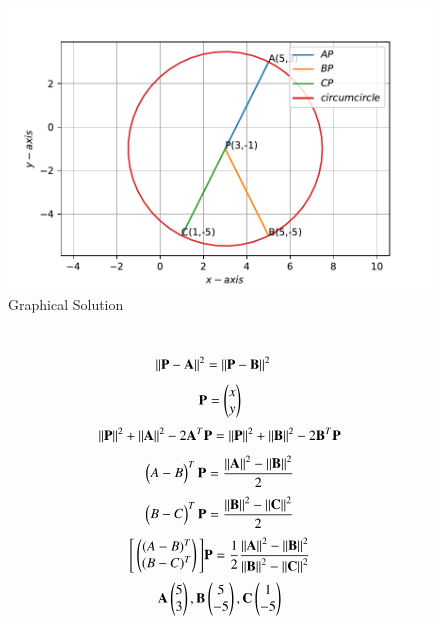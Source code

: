 \documentclass[journal,12pt,twocolumn]{IEEEtran}
\begin{document}
\begin{figure}
    \centering
    \includegraphics[width=\columnwidth]{equidistant point circumcircle.pdf}
    \caption{Graphical Solution}
    \label{fig:my_label}
\end{figure}\\
\begin{align}
    \norm{\Vec{P}-\vec{A}}^2 &= \norm{\vec{P}-\vec{B}}^2
\end{align}
\begin{align}
        \Vec{P}=\myvec{x\\y}
    \end{align}
\begin{align}
    \left\lVert\mathbf{P}\right\rVert^2 + \left\lVert\mathbf{A}\right\rVert^2 -2\mathbf{A}^T\mathbf{P} = \left\lVert\mathbf{P}\right\rVert^2 + \left\lVert\mathbf{B}\right\rVert^2 -2\mathbf{B}^T\mathbf{P}
\end{align}
\begin{align}
    \begin{pmatrix}A-B\end{pmatrix}^T\mathbf{P} = \frac{\left\lVert\mathbf{A}\right\rVert^2-\left\lVert\mathbf{B}\right\rVert^2}{{2}}
\end{align}
\begin{align}
    \begin{pmatrix}B-C\end{pmatrix}^T\mathbf{P} = \frac{\left\lVert\mathbf{B}\right\rVert^2-\left\lVert\mathbf{C}\right\rVert^2}{{2}}
\end{align}
\begin{align}
   \Bigg[\begin{pmatrix}(A-B)^T\\(B-C)^T\end{pmatrix}\Bigg] \mathbf{P} = \frac{1}{2}\frac{\left\lVert\mathbf{A}\right\rVert^2-\left\lVert\mathbf{B}\right\rVert^2}{\left\lVert\mathbf{B}\right\rVert^2-\left\lVert\mathbf{C}\right\rVert^2}
\end{align}
\begin{align}
    \Vec{A}\myvec{5\\3},\Vec{B}\myvec{5\\-5},\Vec{C}\myvec{1\\-5}    \end{align}
\end{document}
